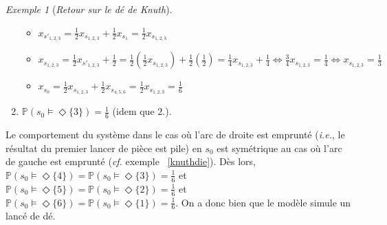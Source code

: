 \documentclass[12pt,a4paper]{report}
\theoremstyle{definition}%
\theoremstyle{remark}
\newtheorem{example}{Exemple}[chapter]
\newcommand{\ie}{\textit{i.e.}, }
\newcommand{\cf}{\textit{cf.} }
\begin{document}
\begin{example}[\textit{Retour sur le dé de Knuth}]
\begin{spacing}{1.5}
\begin{enumerate}
\begin{itemize}
			\item $x_{s'_{1, 2, 3}} = \frac{1}{2} x_{s_{1, 2, 3}} + \frac{1}{2} x_{s_1} = \frac{1}{2} x_{s_{1, 2, 3}}$
			\item $x_{s_{1, 2, 3}} = \frac{1}{2} x_{s'_{1, 2, 3}} + \frac{1}{2}  = 
			\frac{1}{2} (\frac{1}{2} x_{s_{1, 2, 3}}) +\frac{1}{2} (\frac{1}{2})
			= \frac{1}{4} x_{s_{1, 2, 3}} +\frac{1}{4}
			\Leftrightarrow \frac{3}{4} x_{s_{1, 2, 3}} = \frac{1}{4}
			\Leftrightarrow x_{s_{1, 2, 3}} = \frac{1}{3}$
			\item $x_{s_0} = \frac{1}{2} x_{s_{1,2,3}} + \frac{1}{2} x_{s_{4, 5, 6}} = \frac{1}{2} x_{s_{1,2,3}} = \frac{1}{6}$
		\end{itemize}
		\item $\mathbb{P}(s_0 \models \Diamond \{3\}) = \frac{1}{6}$ (idem que $2.$).
	\end{enumerate}\end{spacing}
	Le comportement du système dans le cas où l'arc de droite est emprunté (\ie le résultat du premier lancer de pièce est pile) en $s_0$ est symétrique au cas où l'arc de gauche est emprunté (\cf exemple  ~\ref{knuthdie}). Dès lors, $\mathbb{P}(s_0 \models \Diamond \{4\}) = \mathbb{P}(s_0 \models \Diamond \{3\}) = \frac{1}{6}$ et $\mathbb{P}(s_0 \models \Diamond \{5\}) = \mathbb{P}(s_0 \models \Diamond \{2\}) = \frac{1}{6}$ et $\mathbb{P}(s_0 \models \Diamond \{6\}) = \mathbb{P}(s_0 \models \Diamond \{1\}) = \frac{1}{6}$. On a donc bien que le modèle simule un lancé de dé.
	
\end{example}
\end{document}
